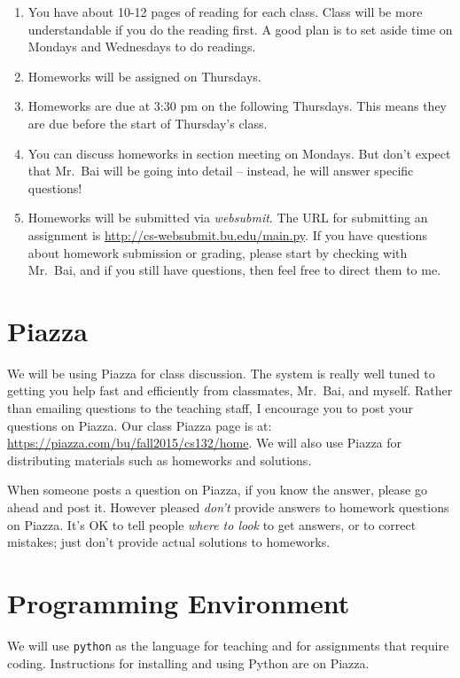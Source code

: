 \documentclass[11pt]{article}
\begin{document}
\begin{enumerate}
\item  You have about 10-12 pages of reading for each class.   Class will be
more understandable if you do the reading first.   A good plan is to set aside
time on Mondays and Wednesdays to do readings.
\item  Homeworks will be assigned on Thursdays.
\item Homeworks are due at 3:30 pm on the following Thursdays.  This means they are due
before the start of Thursday's class.
\item You can discuss homeworks in section meeting on Mondays.   But don't
expect that Mr.\ Bai will be going into detail -- instead, he will
answer specific questions!
\item Homeworks will be submitted via \emph{websubmit}.   The URL for
  submitting an assignment is \url{http://cs-websubmit.bu.edu/main.py}.
  If you have questions about homework submission or grading, please start by checking
  with Mr.\ Bai, and if you still have questions, then feel free to direct them to me.
\end{enumerate}

\section*{Piazza}

We will be using Piazza for class discussion. The system is really well
tuned to getting you help fast and efficiently from classmates, Mr.\ Bai,
and myself. Rather than emailing questions to the teaching staff,
I encourage you to post your questions on Piazza.   Our class Piazza
page  is at: \url{https://piazza.com/bu/fall2015/cs132/home}. 
We will also use Piazza for distributing materials
such as homeworks and solutions.

When someone posts a question on Piazza, if you know the answer, please
go ahead and post it.   However pleased \emph{don't} provide answers to homework
questions on Piazza.   It's OK to tell people \emph{where to look} to
get answers, or to correct mistakes;  just don't provide actual solutions
to homeworks.

\section*{Programming Environment}

We will use \texttt{python} as the language for teaching and for
assignments that require coding.    Instructions for installing and
using Python are on Piazza.
\end{document}
